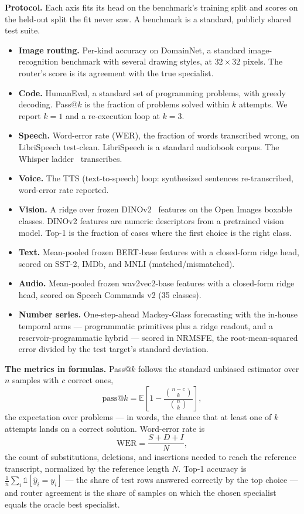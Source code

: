 \documentclass[11pt]{article}
\begin{document}
\textbf{Protocol.} Each axis fits its head on the benchmark's
training split and scores on the held-out split the fit never saw.
A benchmark is a standard, publicly shared test suite.
\begin{itemize}
\item \textbf{Image routing.} Per-kind accuracy on DomainNet, a
standard image-recognition benchmark with several drawing styles,
at $32\times32$ pixels. The router's score is its agreement with
the true specialist.
\item \textbf{Code.} HumanEval, a standard set of programming
problems, with greedy decoding. Pass@$k$ is the fraction of
problems solved within $k$ attempts. We report $k=1$ and a
re-execution loop at $k=3$.
\item \textbf{Speech.} Word-error rate (WER), the fraction of
words transcribed wrong, on LibriSpeech test-clean. LibriSpeech
is a standard audiobook corpus. The Whisper
ladder~\cite{radford2023} transcribes.
\item \textbf{Voice.} The TTS (text-to-speech) loop: synthesized
sentences re-transcribed, word-error rate reported.
\item \textbf{Vision.} A ridge over frozen
DINOv2~\cite{oquab2024} features on the Open Images boxable
classes. DINOv2 features are numeric descriptors from a pretrained
vision model. Top-1 is the fraction of cases where the first
choice is the right class.
\item \textbf{Text.} Mean-pooled frozen BERT-base features with a
closed-form ridge head, scored on SST-2, IMDb, and MNLI
(matched/mismatched).
\item \textbf{Audio.} Mean-pooled frozen wav2vec2-base features
with a closed-form ridge head, scored on Speech Commands v2
(35 classes).
\item \textbf{Number series.} One-step-ahead Mackey-Glass
forecasting with the in-house temporal arms --- programmatic
primitives plus a ridge readout, and a reservoir-programmatic
hybrid --- scored in NRMSFE, the root-mean-squared error divided
by the test target's standard deviation.
\end{itemize}

\textbf{The metrics in formulas.} Pass@$k$ follows the standard
unbiased estimator over $n$ samples with $c$ correct ones,
\begin{equation}
\mathrm{pass@}k = \mathbb{E}\left[1 -
\frac{\binom{n-c}{k}}{\binom{n}{k}}\right],
\end{equation}
the expectation over problems --- in words, the chance that at
least one of $k$ attempts lands on a correct solution.
Word-error rate is
\begin{equation}
\mathrm{WER} = \frac{S + D + I}{N},
\end{equation}
the count of substitutions, deletions, and insertions needed to
reach the reference transcript, normalized by the reference
length $N$. Top-1 accuracy is
$\frac{1}{n}\sum_i \mathbb{1}[\hat y_i = y_i]$ --- the share of
test rows answered correctly by the top choice --- and router
agreement is the share of samples on which the chosen specialist
equals the oracle best specialist.
\end{document}
